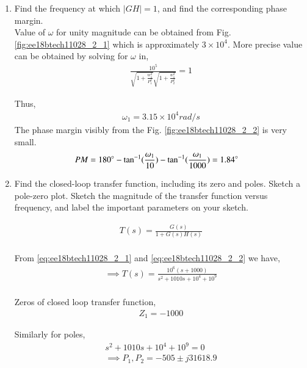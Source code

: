 \begin{enumerate}[label=\arabic*.,ref=\theenumi]
\item Find the frequency at which $ |GH|= 1$, and find the corresponding phase margin.
\\
\solution
Value of $\omega$ for unity magnitude can be obtained from Fig. \ref{fig:ee18btech11028_2_1} which is approximately $3 \times 10^{4}$.
More precise value can be obtained by solving for $\omega$ in,
\begin{align}
    \frac{10^{5}}{\sqrt{1 + \frac{w_{1}^{2}}{P_{1}^{2}}} \sqrt{1 + \frac{w_{1}^{2}}{P_{2}^{2}}}} = 1
\end{align}

Thus, 
\begin{align}
     \omega_{1} = 3.15 \times 10^{4} rad/s
\end{align}
The phase margin visibly from the Fig. \ref{fig:ee18btech11028_2_2} is very small.
\begin{align}
    PM = 180 \degree - \tan^{-1}(\frac{\omega_{1}}{10}) - \tan^{-1}(\frac{\omega_{1}}{1000})
      & = 1.84 \degree
\end{align}

\item Find the closed-loop transfer function, including its zero
and poles. Sketch a pole-zero plot. Sketch the magnitude of
the transfer function versus frequency, and label the important parameters on your sketch.
\\ 
\solution

\begin{align}
    T(s) = \frac{G(s)}{1 + G(s)H(s)}
    \\
\end{align}

From \eqref{eq:ee18btech11028_2_1} and \eqref{eq:ee18btech11028_2_2} we have,
\begin{align}
    \implies T(s) = \frac{10^{6}(s+1000)}{s^{2} + 1010s + 10^{4} + 10^{9}}
    \\
     \label{eq:ee18btech11028_2_3}
\end{align}

Zeros of closed loop transfer function,
\begin{align}
    Z_{1} = -1000
\end{align}

Similarly for poles,
\begin{align}
    s^{2} + 1010s + 10^{4} + 10^{9} = 0
    \\
    \implies P_{1}, P_{2} = -505 \pm j31618.9
\end{align}


\end{enumerate}
